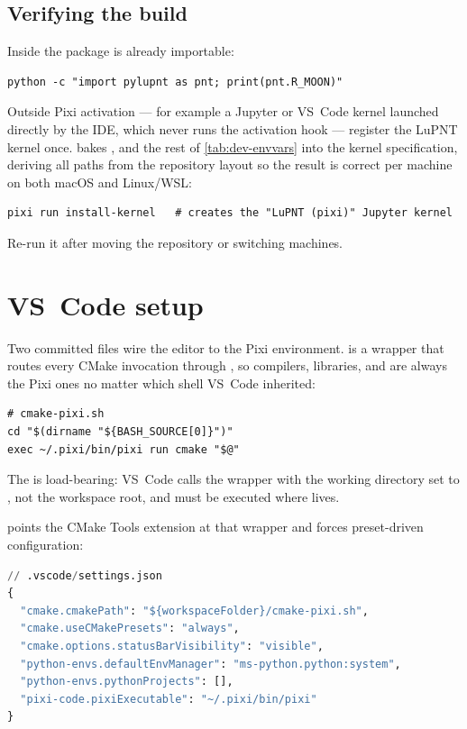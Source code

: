 \subsection{Verifying the build}

Inside  the package is already importable:

\begin{lstlisting}[language=shell]
python -c "import pylupnt as pnt; print(pnt.R_MOON)"
\end{lstlisting}

Outside Pixi activation --- for example a Jupyter or VS~Code kernel launched
directly by the IDE, which never runs the activation hook --- register the
LuPNT kernel once.  bakes ,
 and the rest of \cref{tab:dev-envvars} into the kernel
specification, deriving all paths from the repository layout so the result is
correct per machine on both macOS and Linux/WSL:

\begin{lstlisting}[language=shell]
pixi run install-kernel   # creates the "LuPNT (pixi)" Jupyter kernel
\end{lstlisting}

Re-run it after moving the repository or switching machines.

\section{VS~Code setup}
\label{sec:dev-vscode}

Two committed files wire the editor to the Pixi environment.
 is a wrapper that routes every CMake invocation through
, so compilers, libraries, and  are always
the Pixi ones no matter which shell VS~Code inherited:

\begin{lstlisting}[language=shell]
# cmake-pixi.sh
cd "$(dirname "${BASH_SOURCE[0]}")"
exec ~/.pixi/bin/pixi run cmake "$@"
\end{lstlisting}

The  is load-bearing: VS~Code calls the wrapper with the working
directory set to \code{/}, not the workspace root, and  must be
executed where  lives.

 points the CMake Tools extension at that wrapper
and forces preset-driven configuration:

\begin{lstlisting}[language=py]
// .vscode/settings.json
{
  "cmake.cmakePath": "${workspaceFolder}/cmake-pixi.sh",
  "cmake.useCMakePresets": "always",
  "cmake.options.statusBarVisibility": "visible",
  "python-envs.defaultEnvManager": "ms-python.python:system",
  "python-envs.pythonProjects": [],
  "pixi-code.pixiExecutable": "~/.pixi/bin/pixi"
}
\end{lstlisting}

